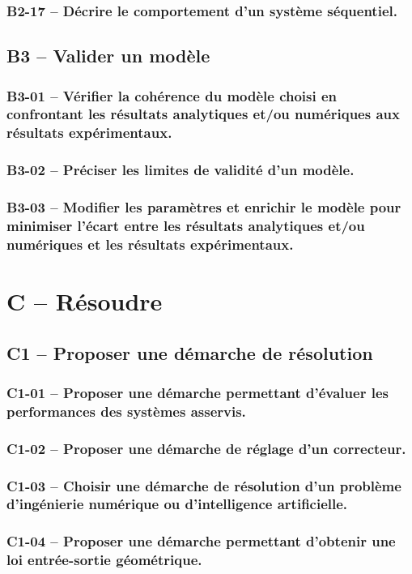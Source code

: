 \subsubsection*{B2-17 -- Décrire le comportement d'un système séquentiel.}  
\subsection{B3 -- Valider un modèle}  
\subsubsection*{B3-01 -- Vérifier la cohérence du modèle choisi en confrontant les résultats analytiques et/ou numériques aux résultats expérimentaux.}  
\subsubsection*{B3-02 -- Préciser les limites de validité d'un modèle.}  
\subsubsection*{B3-03 -- Modifier les paramètres et enrichir le modèle pour minimiser l’écart entre les résultats analytiques et/ou numériques et les résultats expérimentaux.}  
\section{C -- Résoudre}  
\subsection{C1 -- Proposer une démarche de résolution}  
\subsubsection*{C1-01 -- Proposer une démarche permettant d'évaluer les performances des systèmes asservis.}  
\subsubsection*{C1-02 -- Proposer une démarche de réglage d'un correcteur.}  
\subsubsection*{C1-03 -- Choisir une démarche de résolution d’un problème d'ingénierie numérique ou d'intelligence artificielle. }  
\subsubsection*{C1-04 -- Proposer une démarche permettant d'obtenir une loi entrée-sortie géométrique. }  
